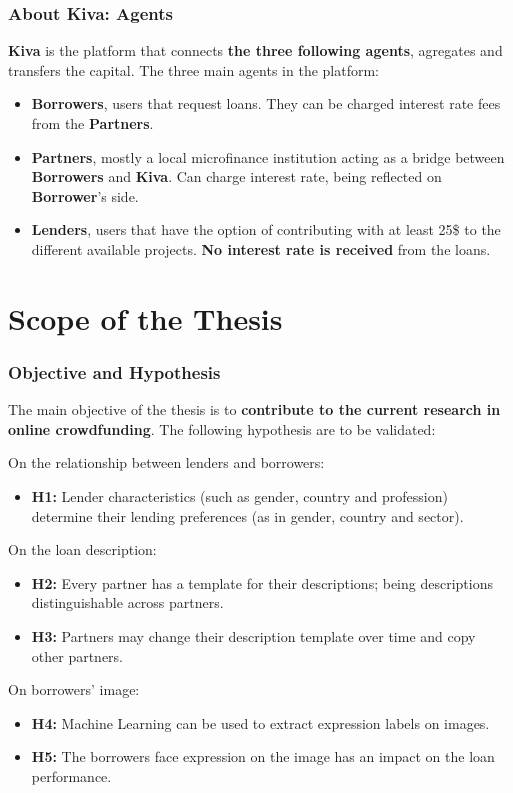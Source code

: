 \documentclass{beamer}
\begin{document}
\begin{frame}\frametitle{About Kiva: Agents}
\footnotesize{
\textbf{Kiva} is the platform that connects \textbf{the three following agents}, agregates and transfers the capital.
The three main agents in the platform:
\begin{itemize}
\item \textbf{Borrowers}, users that request loans. They can be charged interest rate fees from the \textbf{Partners}.
\item \textbf{Partners}, mostly a local microfinance institution acting as a bridge between \textbf{Borrowers} and \textbf{Kiva}. Can charge interest rate, being reflected on \textbf{Borrower}'s side.
\item \textbf{Lenders}, users that have the option of contributing with at least 25\$ to the different available projects. \textbf{No interest rate is received} from the loans.
\end{itemize}}
\end{frame}

\section{Scope of the Thesis} 

\begin{frame}\frametitle{Objective and Hypothesis}
\footnotesize{
The main objective of the thesis is to \textbf{contribute to the current research in online crowdfunding}.
The following hypothesis are to be validated:}

\tiny{
\begin{block}{On the relationship between lenders and borrowers:}
\begin{itemize}
\item \textbf{H1:} Lender characteristics (such as gender, country and profession) determine their lending preferences (as in gender, country and sector).
\end{itemize}
\end{block}

\begin{block}{On the loan description:}
\begin{itemize}
\item \textbf{H2:} Every partner has a template for their descriptions; being descriptions distinguishable across partners.
\item \textbf{H3:} Partners may change their description template over time and copy other partners.
\end{itemize}
\end{block}

\begin{block}{On borrowers' image:}
\begin{itemize}
\item \textbf{H4:} Machine Learning can be used to extract expression labels on images.
\item \textbf{H5:} The borrowers face expression on the image has an impact on the loan performance.
\end{itemize}
\end{block}
}
\end{frame}
\end{document}
